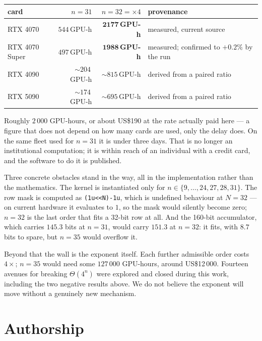 \documentclass[11pt,a4paper]{article}
\begin{document}
\begin{center}
\begin{tabular}{@{}lrrl@{}}
\toprule
card & $n{=}31$ & $n{=}32 = {\times}4$ & provenance \\
\midrule
RTX 4070        & $544$\,GPU-h & $\mathbf{2177}$\,\textbf{GPU-h} & measured, current source \\
RTX 4070 Super  & $497$\,GPU-h & $\mathbf{1988}$\,\textbf{GPU-h} & measured; confirmed to $+0.2\%$ by the run \\
RTX 4090        & ${\sim}204$\,GPU-h & ${\sim}815$\,GPU-h & derived from a paired ratio \\
RTX 5090        & ${\sim}174$\,GPU-h & ${\sim}695$\,GPU-h & derived from a paired ratio \\
\bottomrule
\end{tabular}
\end{center}

\noindent
Roughly $2\,000$ GPU-hours, or about \textsf{US\$190} at the rate actually paid
here --- a figure that does not depend on how many cards are used, only the
delay does. On the same fleet used for $n=31$ it is under three days. That is no
longer an institutional computation; it is within reach of an individual with a
credit card, and the software to do it is published.

Three concrete obstacles stand in the way, all in the implementation rather than
the mathematics. The kernel is instantiated only for
$n \in \{9,\dots,24,27,28,31\}$. The row mask is computed as
\texttt{(1u<<N)-1u}, which is undefined behaviour at $N=32$ --- on current
hardware it evaluates to $1$, so the mask would silently become zero; $n=32$ is
the last order that fits a 32-bit row at all. And the 160-bit accumulator, which
carries $145.3$ bits at $n=31$, would carry $151.3$ at $n=32$: it fits, with
$8.7$ bits to spare, but $n=35$ would overflow it.

Beyond that the wall is the exponent itself. Each further admissible order costs
$4\times$; $n=35$ would need some $127\,000$ GPU-hours, around
\textsf{US\$12\,000}. Fourteen avenues for breaking $\Theta(4^n)$ were explored
and closed during this work, including the two negative results above. We do not
believe the exponent will move without a genuinely new mechanism.

\section{Authorship}
\label{sec:authorship}
\end{document}
